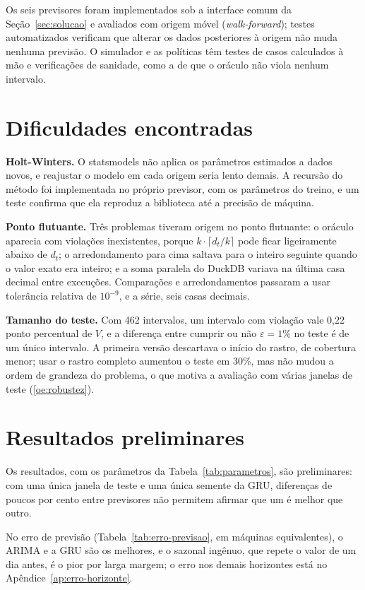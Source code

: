 Os seis previsores foram implementados sob a interface comum da Seção~\ref{sec:solucao} e avaliados com origem móvel (\textit{walk-forward}); testes automatizados verificam que alterar os dados posteriores à origem não muda nenhuma previsão. O simulador e as políticas têm testes de casos calculados à mão e verificações de sanidade, como a de que o oráculo não viola nenhum intervalo.

\section{Dificuldades encontradas}
\label{sec:dificuldades}

\textbf{Holt-Winters.} O statsmodels não aplica os parâmetros estimados a dados novos, e reajustar o modelo em cada origem seria lento demais. A recursão do método foi implementada no próprio previsor, com os parâmetros do treino, e um teste confirma que ela reproduz a biblioteca até a precisão de máquina.

\textbf{Ponto flutuante.} Três problemas tiveram origem no ponto flutuante: o oráculo aparecia com violações inexistentes, porque $k \cdot \lceil d_t / k \rceil$ pode ficar ligeiramente abaixo de $d_t$; o arredondamento para cima saltava para o inteiro seguinte quando o valor exato era inteiro; e a soma paralela do DuckDB variava na última casa decimal entre execuções. Comparações e arredondamentos passaram a usar tolerância relativa de $10^{-9}$, e a série, seis casas decimais.

\textbf{Tamanho do teste.} Com 462 intervalos, um intervalo com violação vale 0,22 ponto percentual de $V$, e a diferença entre cumprir ou não $\varepsilon = 1\%$ no teste é de um único intervalo. A primeira versão descartava o início do rastro, de cobertura menor; usar o rastro completo aumentou o teste em 30\%, mas não mudou a ordem de grandeza do problema, o que motiva a avaliação com várias janelas de teste (\ref{oe:robustez}).

\section{Resultados preliminares}
\label{sec:resultados-preliminares}

Os resultados, com os parâmetros da Tabela~\ref{tab:parametros}, são preliminares: com uma única janela de teste e uma única semente da GRU, diferenças de poucos por cento entre previsores não permitem afirmar que um é melhor que outro.

No erro de previsão (Tabela~\ref{tab:erro-previsao}, em máquinas equivalentes), o ARIMA e a GRU são os melhores, e o sazonal ingênuo, que repete o valor de um dia antes, é o pior por larga margem; o erro nos demais horizontes está no Apêndice~\ref{ap:erro-horizonte}.

